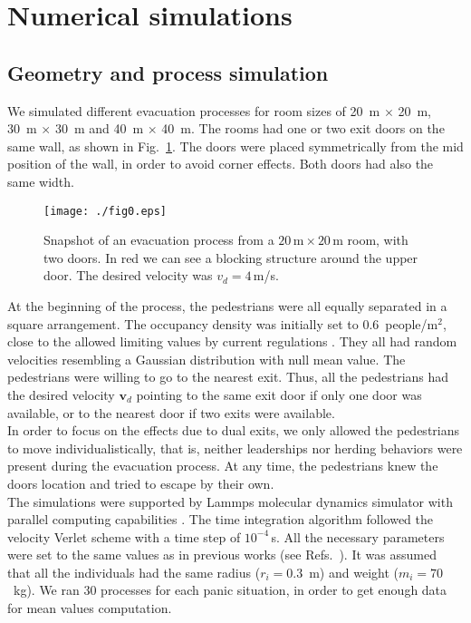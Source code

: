 \section{\label{simulations}Numerical simulations}



\subsection{\label{numerical_geometry} Geometry and process simulation}


We simulated different evacuation processes for room sizes of 20~m $\times$ 
20~m, 30~m $\times$ 30~m and 40~m $\times$ 40~m. The rooms had one or two exit 
doors on the same wall, as shown in Fig.~\ref{fig:19}. The doors were placed 
symmetrically from the mid position of the wall, in order to avoid corner 
effects. Both doors had also the same width.  \\

\begin{figure}
\texttt{[image: ./fig0.eps]}
\caption{\label{fig:19} Snapshot of an evacuation process from a 
$20\,\mathrm{m}\times20\,$m room, with two doors. In red we can see a blocking 
structure around the upper door. The desired velocity was $v_d=4\,$m/s.  }
\end{figure}


At the beginning of the process, the pedestrians were all equally separated 
in a square arrangement. The occupancy density was initially set to 
0.6~people/m$^2$, close to the allowed limiting values by current regulations 
\cite{mysen}. They all had random velocities resembling a Gaussian distribution 
with null mean value. The pedestrians were willing to go to the nearest exit. 
Thus, all the pedestrians had the desired velocity $\mathbf{v}_d$ pointing to 
the same exit door if only one door was available, or to the nearest door if two 
exits were available.  \\

In order to focus on the effects due to dual exits, we only allowed the 
pedestrians to move individualistically, that is, neither leaderships nor 
herding behaviors were present during the evacuation process. At any time, the 
pedestrians knew the doors location and tried to escape by their own.  \\

The simulations were supported by {\sc Lammps} molecular 
dynamics simulator with parallel computing capabilities \cite{plimpton}. The 
time integration algorithm followed the velocity Verlet scheme with a time step 
of $10^{-4}\,$s. All the necessary parameters were set to the same values as in 
previous works (see Refs.~\cite{Dorso3,Dorso4}). It was assumed that all the 
individuals had the same radius ($r_i=0.3$~m) and weight ($m_i=70$~kg). We ran 
30 processes for each panic situation, in order to get enough data for mean 
values computation. \\

